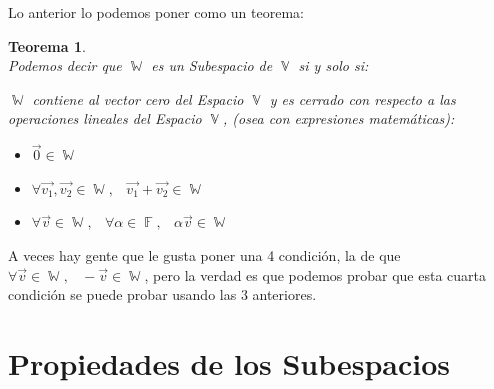 \documentclass[12pt, fleqn]{report}                             %
\newcommand \ForceNewLine {$\Space$\\}                          %
\DeclareMathOperator \Space {\quad}                             %
\DeclareMathOperator \MiniSpace {\;}                            %
\newtheorem{Theorem}{Teorema}[section]                          %
\theoremstyle{break}                                            %
\DeclareMathOperator \GenericField {\mathbb{F}}                 %
\DeclareMathOperator \VectorSet    {\mathbb{V}}                 %
\DeclareMathOperator \SubVectorSet {\mathbb{W}}                 %
\begin{document}
            Lo anterior lo podemos poner como un teorema:

            \begin{Theorem}
                \ForceNewLine
                Podemos decir que $\SubVectorSet$ es un Subespacio de $\VectorSet$
                si y solo si:

                $\SubVectorSet$ contiene al vector cero del Espacio $\VectorSet$ y es cerrado
                con respecto a las operaciones lineales del Espacio $\VectorSet$, (osea con
                expresiones matemáticas):

                \begin{itemize}
                    \item $\vec{0} \in \SubVectorSet$
                    
                    \item $\forall \vec{v_1}, \vec{v_2} \in \SubVectorSet, \MiniSpace
                                \vec{v_1} + \vec{v_2} \in \SubVectorSet$

                    \item $\forall \vec{v} \in \SubVectorSet, \MiniSpace
                                \forall \alpha \in \GenericField, \MiniSpace
                                    \alpha \vec{v} \in \SubVectorSet$
                \end{itemize}

            \end{Theorem}

            A veces hay gente que le gusta poner una 4 condición, la de que
            $\forall \vec{v} \in \SubVectorSet, \MiniSpace -\vec{v} \in \SubVectorSet$,
            pero la verdad es que podemos probar que esta cuarta condición se puede probar
            usando las 3 anteriores.



        \clearpage
        \section{Propiedades de los Subespacios}
\end{document}
